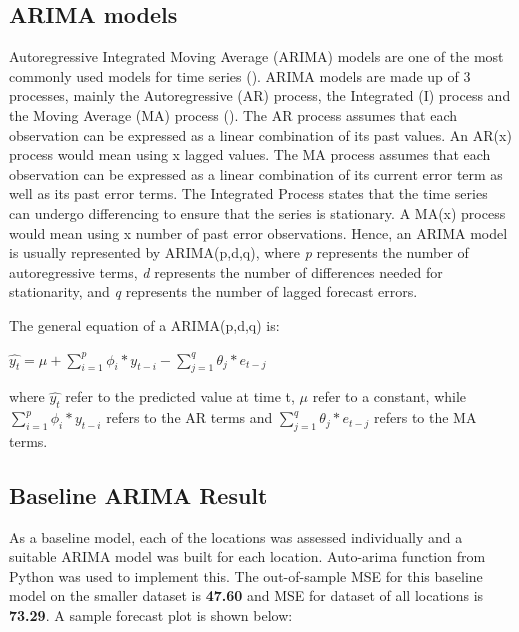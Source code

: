 \documentclass[12pt, letterpaper] {article}
\begin{document}
\subsection{ARIMA models}
Autoregressive Integrated Moving Average (ARIMA) models are one of the most commonly used models for time series (\cite{Asha2016}). ARIMA models are made up of 3 processes, mainly the Autoregressive (AR) process, the Integrated (I) process and the Moving Average (MA) process (\cite{Jamal2018}). The AR process assumes that each observation can be expressed as a linear combination of its past values.  An AR(x) process would mean using x lagged values. The MA process assumes that each observation can be expressed as a linear combination of its current error term as well as its past error terms. The Integrated Process states that the time series can undergo differencing to ensure that the series is stationary. A MA(x) process would mean using x number of past error observations. Hence, an ARIMA model is usually represented by ARIMA(p,d,q), where \textit{p} represents the number of autoregressive terms, \textit{d} represents the number of differences needed for stationarity, and \textit{q} represents the number of lagged forecast errors. 

\noindent The general equation of a ARIMA(p,d,q) is: 
\begin{center}
$\hat{y_t} = \mu + \sum_{i=1}^{p} \phi_i * y_{t-i} - \sum_{j=1}^{q} \theta_j * e_{t-j}$
\end{center}

\noindent where $\hat{y_t}$ refer to the predicted value at time t, $\mu$ refer to a constant, while $\sum_{i=1}^{p} \phi_i * y_{t-i}$ refers to the AR terms and $\sum_{j=1}^{q} \theta_j * e_{t-j}$ refers to the MA terms.

\subsection{Baseline ARIMA Result}
As a baseline model, each of the locations was assessed individually and a suitable ARIMA model was built for each location. Auto-arima function from Python was used to implement this. The out-of-sample MSE for this baseline model on the smaller dataset is \textbf{47.60} and MSE for dataset of all locations is \textbf{73.29}. A sample forecast plot is shown below:
\end{document}
